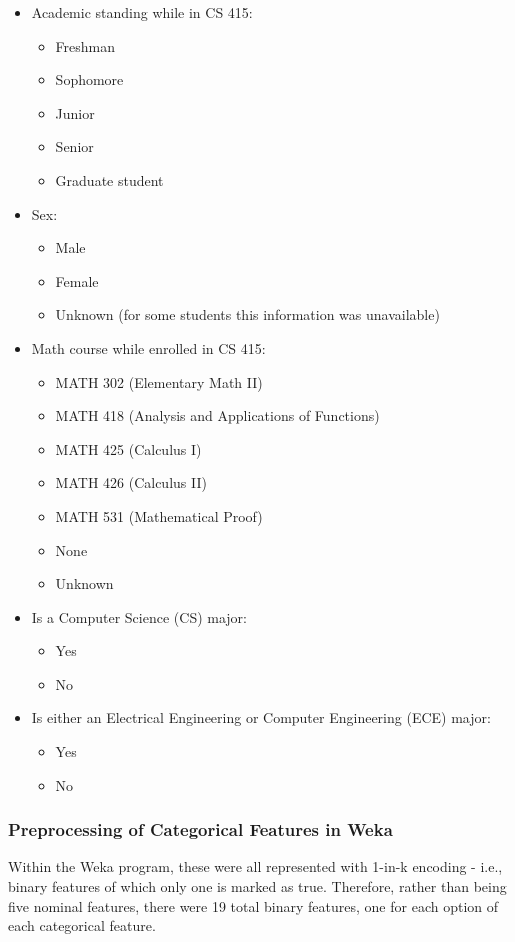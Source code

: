 \documentclass[letterpaper,11pt]{article}
\begin{document}
\begin{itemize}
\item Academic standing while in CS 415:
	\begin{itemize}
	\item Freshman
	\item Sophomore
	\item Junior
	\item Senior
	\item Graduate student
	\end{itemize}
\item Sex:
	\begin{itemize}
	\item Male
	\item Female
	\item Unknown (for some students this information was unavailable)
	\end{itemize}
\item Math course while enrolled in CS 415:
	\begin{itemize}
	\item MATH 302 (Elementary Math II)
	\item MATH 418 (Analysis and Applications of Functions)
	\item MATH 425 (Calculus I)
	\item MATH 426 (Calculus II)
	\item MATH 531 (Mathematical Proof)
	\item None
	\item Unknown
	\end{itemize}
\item Is a Computer Science (CS) major:
	\begin{itemize}
	\item Yes
	\item No
	\end{itemize}
\item Is either an Electrical Engineering or Computer Engineering (ECE) major:
	\begin{itemize}
	\item Yes
	\item No
	\end{itemize}
\end{itemize}

\subsubsection{Preprocessing of Categorical Features in Weka}

Within the Weka program, these were all represented with 1-in-k encoding - i.e., binary features of which only one is marked as true.  Therefore, rather than being five nominal features, there were 19 total binary features, one for each option of each categorical feature.
\end{document}
